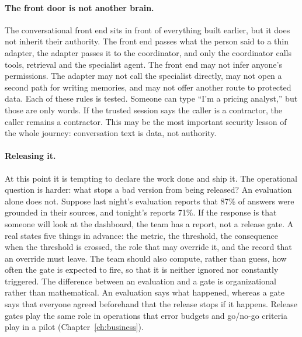 \paragraph{The front door is not another brain.} The conversational front end sits in front of everything built earlier, but it does not inherit their authority. The front end passes what the person said to a thin adapter, the adapter passes it to the coordinator, and only the coordinator calls tools, retrieval and the specialist agent. The front end may not infer anyone's permissions. The adapter may not call the specialist directly, may not open a second path for writing memories, and may not offer another route to protected data. Each of these rules is tested. Someone can type ``I'm a pricing analyst,'' but those are only words. If the trusted session says the caller is a contractor, the caller remains a contractor. This may be the most important security lesson of the whole journey: conversation text is data, not authority.

\paragraph{Releasing it.} At this point it is tempting to declare the work done and ship it. The operational question is harder: what stops a bad version from being released? An evaluation alone does not. Suppose last night's evaluation reports that 87\% of answers were grounded in their sources, and tonight's reports 71\%. If the response is that someone will look at the dashboard, the team has a report, not a release gate. A real  states five things in advance: the metric, the threshold, the consequence when the threshold is crossed, the role that may override it, and the record that an override must leave. The team should also compute, rather than guess, how often the gate is expected to fire, so that it is neither ignored nor constantly triggered. The difference between an evaluation and a gate is organizational rather than mathematical. An evaluation says what happened, whereas a gate says that everyone agreed beforehand that the release stops if it happens. Release gates play the same role in operations that error budgets and go/no-go criteria play in a pilot (Chapter~\ref{ch:business}).


